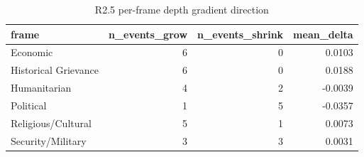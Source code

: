 \begin{table}
\caption{R2.5 per-frame depth gradient direction}
\label{tab:r1r2_depth_gradients}
\begin{tabular}{lrrr}
\toprule
frame & n\_events\_grow & n\_events\_shrink & mean\_delta \\
\midrule
Economic & 6 & 0 & 0.0103 \\
Historical Grievance & 6 & 0 & 0.0188 \\
Humanitarian & 4 & 2 & -0.0039 \\
Political & 1 & 5 & -0.0357 \\
Religious/Cultural & 5 & 1 & 0.0073 \\
Security/Military & 3 & 3 & 0.0031 \\
\bottomrule
\end{tabular}
\end{table}
